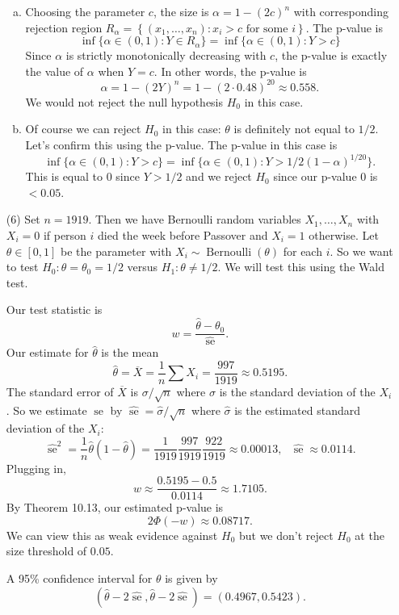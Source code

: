\documentclass[10pt]{article}
\newcommand{\Bern}{\operatorname{Bernoulli}}
\newcommand{\se}{\operatorname{se}}
\begin{document}
\begin{enumerate}
\begin{enumerate}[(a)]
\item
Choosing the parameter $c$, the size is $\alpha=1-(2c)^n$ with corresponding
rejection region
$R_\alpha = \left\{ (x_1,\ldots,x_n) : x_i > c \text{ for some } i\right\}$.
The p-value is
\[
\inf \{\alpha \in (0,1) : Y \in R_\alpha\} = \inf\{\alpha \in (0,1) : Y > c\}
\]
Since $\alpha$ is strictly monotonically decreasing with $c$, the p-value
is exactly the value of $\alpha$ when $Y=c$. In other words, the p-value is
\[\alpha=1-(2Y)^n=1-(2 \cdot 0.48)^{20} \approx 0.558.\]
We would not reject the null hypothesis $H_0$ in this case.

\item
Of course we can reject $H_0$ in this case: $\theta$ is definitely
not equal to $1/2$. Let's confirm this using the p-value.
The p-value in this case is
\[
\inf\{\alpha \in (0,1) : Y > c\} =
\inf \{\alpha \in (0,1) : Y > 1/2(1-\alpha)^{1/20}\}.
\]
This is equal to 0 since $Y > 1/2$
and we reject $H_0$ since our p-value $0$ is $<0.05$.
\end{enumerate}

\item[(6)]
Set $n=1919$. Then we have Bernoulli random variables $X_1,\ldots,X_n$
with $X_i=0$ if person $i$ died the week before Passover and $X_i=1$ otherwise.
Let $\theta\in [0,1]$ be the parameter with $X_i\sim \Bern(\theta)$ for each $i$.
So we want to test $H_0:\theta=\theta_0=1/2$ versus $H_1:\theta \neq 1/2$.
We will test this using the Wald test.

Our test statistic is
\[
w = \frac{\hat{\theta} - \theta_0}{\widehat{\se}}.
\]
Our estimate for $\hat{\theta}$ is the mean
\[
\hat{\theta}=\overline{X}=\frac{1}{n}\sum X_i = \frac{997}{1919}\approx 0.5195.
\]
The standard error of $\overline{X}$ is $\sigma/\sqrt{n}$ where $\sigma$
is the standard deviation of the $X_i$. So we estimate $\se$ by
$\widehat{\se}=\widehat{\sigma}/\sqrt{n}$ where $\widehat{\sigma}$ is the
estimated standard deviation of the $X_i$:
\[
\widehat{\se}^2= \frac{1}{n} \hat\theta(1-\hat\theta)
= \frac{1}{1919}\frac{997}{1919}\frac{922}{1919} \approx 0.00013,
\ \ \ \widehat{\se} \approx 0.0114.
\]
Plugging in,
\[
w \approx \frac{0.5195 - 0.5}{0.0114} \approx 1.7105.
\]
By Theorem 10.13, our estimated p-value is
\[
2\Phi(-w)\approx 0.08717.
\]
We can view this as weak evidence against $H_0$ but we don't reject $H_0$
at the size threshold of $0.05$.

A 95\% confidence interval for $\theta$ is given by
\[
(\hat{\theta} - 2 \widehat{\se}, \hat{\theta} - 2\widehat{\se})
= (0.4967, 0.5423).
\]


\end{enumerate}
\end{document}
